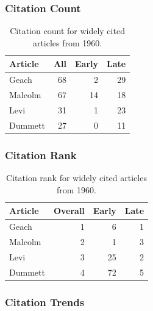 \documentclass[
  10pt,
  letterpaper,
  DIV=11,
  numbers=noendperiod,
  twoside]{scrartcl}
\begin{document}
\subsubsection*{Citation Count}\label{sec-count-1960}

\begin{longtable}[]{@{}lrrr@{}}

\caption{\label{tbl-citation-count-1960}Citation count for widely cited
articles from 1960.}

\tabularnewline

\toprule\noalign{}
Article & All & Early & Late \\
\midrule\noalign{}
\endhead
\bottomrule\noalign{}
\endlastfoot
Geach & 68 & 2 & 29 \\
Malcolm & 67 & 14 & 18 \\
Levi & 31 & 1 & 23 \\
Dummett & 27 & 0 & 11 \\

\end{longtable}

\subsubsection*{Citation Rank}\label{sec-rank-1960}

\begin{longtable}[]{@{}lrrr@{}}

\caption{\label{tbl-citation-rank-1960}Citation rank for widely cited
articles from 1960.}

\tabularnewline

\toprule\noalign{}
Article & Overall & Early & Late \\
\midrule\noalign{}
\endhead
\bottomrule\noalign{}
\endlastfoot
Geach & 1 & 6 & 1 \\
Malcolm & 2 & 1 & 3 \\
Levi & 3 & 25 & 2 \\
Dummett & 4 & 72 & 5 \\

\end{longtable}

\subsubsection*{Citation Trends}\label{sec-trends-1960}
\end{document}
